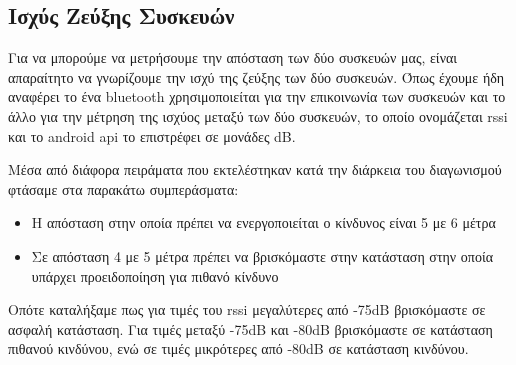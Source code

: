 \subsection{Ισχύς Ζεύξης Συσκευών}
Για να μπορούμε να μετρήσουμε την απόσταση των δύο συσκευών μας, είναι 
απαραίτητο να γνωρίζουμε την ισχύ της ζεύξης των δύο συσκευών. Όπως έχουμε 
ήδη αναφέρει το ένα bluetooth χρησιμοποιείται για την επικοινωνία των συσκευών και 
το άλλο για την μέτρηση της ισχύος μεταξύ των δύο συσκευών, το οποίο ονομάζεται 
rssi και το android api το επιστρέφει σε μονάδες dB. 

Μέσα από διάφορα πειράματα που εκτελέστηκαν κατά την διάρκεια του διαγωνισμού 
φτάσαμε στα παρακάτω συμπεράσματα:
\begin{itemize}
\item Η απόσταση στην οποία πρέπει να ενεργοποιείται ο κίνδυνος είναι 5 με 6  
μέτρα
\item Σε απόσταση 4 με 5 μέτρα πρέπει να βρισκόμαστε στην κατάσταση στην οποία 
υπάρχει προειδοποίηση για πιθανό κίνδυνο
\end{itemize}   

Οπότε καταλήξαμε πως για τιμές του rssi μεγαλύτερες από -75dB βρισκόμαστε σε 
ασφαλή κατάσταση.
Για τιμές μεταξύ -75dB και -80dB βρισκόμαστε σε κατάσταση πιθανού 
κινδύνου, ενώ σε τιμές μικρότερες από -80dB σε κατάσταση κινδύνου.
